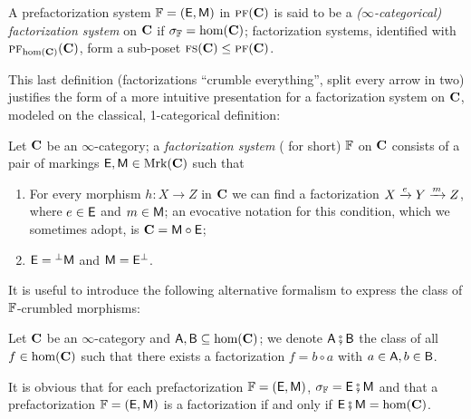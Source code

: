 \begin{definition}
\begin{definition}\label{def:effe.esse}
A prefactorization system $\mathbb{F}=(\mathsf{E},\mathsf{M})$ in $\text{\scshape pf}(\mathbf{C})$ is said to be a \emph{($\infty$\hyp{}categorical) factorization system} on $\mathbf{C}$ if $\sigma_{\mathbb{F}}=\text{hom}(\mathbf{C})$; factorization systems, identified with $\text{\scshape pf}_{\text{hom}(\mathbf{C})}(\mathbf{C})$, form a sub\hyp{}poset $\text{\scshape fs}(\mathbf{C})\leq \text{\scshape pf}(\mathbf{C})$.
\end{definition}
This last definition (factorizations ``crumble everything'', \ie split every arrow in two) justifies the form of a more intuitive presentation for a factorization system on $\mathbf{C}$, modeled on the classical, 1\hyp{}categorical definition:
\begin{definition}\label{def:effe.esse2}
Let $\mathbf{C}$ be an $\infty$\hyp{}category; a \emph{factorization system} ( for short) $\mathbb{F}$ on $\mathbf{C}$ consists of a pair of markings $\mathsf{E}, \mathsf{M}\in\text{Mrk}(\mathbf{C})$ such that
\begin{enumerate}
\item For every morphism $h\colon X\to Z$ in $\mathbf{C}$ we can find a factorization $X\xrightarrow{e} Y\xrightarrow{m} Z$, where $e\in\mathsf{E}$ and $m\in\mathsf{M}$; an evocative notation for this condition, which we sometimes adopt, is $\mathbf{C} = \mathsf{M}\circ \mathsf{E}$;
\item $\mathsf{E} ={}^{\perp}\mathsf{M}$ and $\mathsf{M} = \mathsf{E}^{\perp}$.
\end{enumerate}
\end{definition}
It is useful to introduce the following alternative formalism to express the class of $\mathbb{F}$\hyp{}crumbled morphisms:
\begin{definition}\label{fat.notation}
Let $\mathbf{C}$ be an $\infty$\hyp{}category and $\mathsf{A},\mathsf{B}\subseteq \text{hom}(\mathbf{C})$; we denote $\mathsf{A}\fatsemi \mathsf{B}$ the class of all $f\in\text{hom}(\mathbf{C})$ such that there exists a factorization $f = b\circ a$ with $a\in\mathsf{A}, b\in\mathsf{B}$.
\end{definition}
It is obvious that for each prefactorization $\mathbb{F} = (\mathsf{E},\mathsf{M})$, $\sigma_{\mathbb{F}} = \mathsf{E}\fatsemi \mathsf{M}$ and that a prefactorization $\mathbb{F} = (\mathsf{E},\mathsf{M})$ is a factorization if and only if $\mathsf{E}\fatsemi\mathsf{M} = \text{hom}(\mathbf{C})$.


\end{definition}
